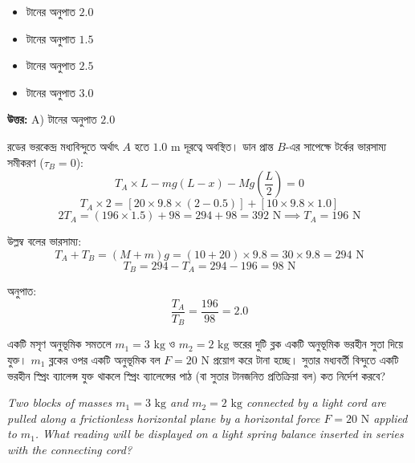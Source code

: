 \documentclass[12pt, a4paper]{article}
\begin{document}
{%
\begin{itemize}[label={}, leftmargin=1cm, itemsep=0.5em]
\item[\textbf{A)}] টানের অনুপাত $2.0$
\item[\textbf{B)}] টানের অনুপাত $1.5$
\item[\textbf{C)}] টানের অনুপাত $2.5$
\item[\textbf{D)}] টানের অনুপাত $3.0$
\end{itemize}

\vspace{0.5em}
\begin{tcolorbox}[answerbox]
\textbf{\color{success} উত্তর:} A) টানের অনুপাত $2.0$
\end{tcolorbox}
\vspace{1em}

\begin{tcolorbox}[solutionbox={সমাধান (Solution)}]
\noindent
রডের ভরকেন্দ্র মধ্যবিন্দুতে অর্থাৎ $A$ হতে $1.0\text{ m}$ দূরত্বে অবস্থিত। 
ডান প্রান্ত $B$-এর সাপেক্ষে টর্কের ভারসাম্য সমীকরণ ($\tau_B = 0$):
\[ T_A \times L - m g (L - x) - M g \left(\frac{L}{2}\right) = 0 \]
\[ T_A \times 2 = [20 \times 9.8 \times (2 - 0.5)] + [10 \times 9.8 \times 1.0] \]
\[ 2 T_A = (196 \times 1.5) + 98 = 294 + 98 = 392\text{ N} \implies T_A = 196\text{ N} \]

উল্লম্ব বলের ভারসাম্য:
\[ T_A + T_B = (M + m) g = (10 + 20) \times 9.8 = 30 \times 9.8 = 294\text{ N} \]
\[ T_B = 294 - T_A = 294 - 196 = 98\text{ N} \]

অনুপাত:
\[ \frac{T_A}{T_B} = \frac{196}{98} = 2.0 \]
\end{tcolorbox}

\begin{tcolorbox}[questionbox={প্রশ্ন (Question) 18}]
\noindent
একটি মসৃণ অনুভূমিক সমতলে $m_1 = 3\text{ kg}$ ও $m_2 = 2\text{ kg}$ ভরের দুটি ব্লক একটি অনুভূমিক ভরহীন সুতা দিয়ে যুক্ত। $m_1$ ব্লকের ওপর একটি অনুভূমিক বল $F = 20\text{ N}$ প্রয়োগ করে টানা হচ্ছে। সুতার মধ্যবর্তী বিন্দুতে একটি ভরহীন স্প্রিং ব্যালেন্স যুক্ত থাকলে স্প্রিং ব্যালেন্সের পাঠ (বা সুতার টানজনিত প্রতিক্রিয়া বল) কত নির্দেশ করবে?

\vspace{0.8em}
\begin{english}
\noindent\textit{\color{darkgray}
Two blocks of masses $m_1 = 3\text{ kg}$ and $m_2 = 2\text{ kg}$ connected by a light cord are pulled along a frictionless horizontal plane by a horizontal force $F = 20\text{ N}$ applied to $m_1$. What reading will be displayed on a light spring balance inserted in series with the connecting cord?
}
\end{english}
\end{tcolorbox}

}
\end{document}

